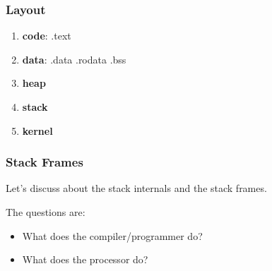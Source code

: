 
\begin{frame}
  \frametitle{Layout}

  \begin{enumerate}
    \item
      \textbf{code}: .text
    \item
      \textbf{data}: .data .rodata .bss
    \item
      \textbf{heap}
    \item
      \textbf{stack}
    \item
      \textbf{kernel}
  \end{enumerate}
\end{frame}


\begin{frame}
  \frametitle{Stack Frames}

  Let's discuss about the stack internals and the stack frames.

  \-

  The questions are:

  \begin{itemize}
    \item
      What does the compiler/programmer do?
    \item
      What does the processor do?
  \end{itemize}
\end{frame}


